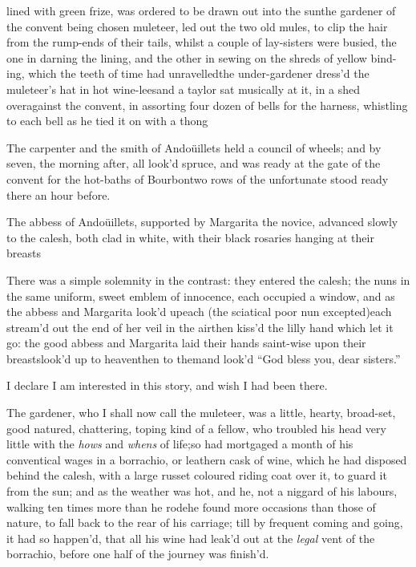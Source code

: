 \documentclass{article}
\begin{document}
\noindent
{}\break lined with green frize,
was ordered to be drawn out into the sun\tsk the gardener of the
convent being chosen muleteer, led out the two old mules, to clip
the hair from the rump-ends of their tails, whilst a couple of
lay-sisters were busied, the one in darning the lining, and the
other in sewing on the shreds of yellow bind- ing, which the teeth of
time had unravelled\tsh the under-gardener dress’d
the muleteer’s hat in hot wine-lees\tsh and a taylor
sat musically at it, in a shed overagainst the convent, in
assorting four dozen of bells for the harness, whistling to each
bell as he tied it on with a thong\tsh

\tsh The carpenter and the smith of Andoüillets held a council
of wheels; and by seven, the morning after, all look’d spruce,
and was ready at the gate of the convent for the hot-baths of
Bourbon\tsk\break two rows of the unfortunate stood ready there an
hour before.

The abbess of Andoüillets, supported by Margarita the novice, advanced slowly to the
calesh, both clad in white, with their black rosaries hanging at their breasts\tsh

\tsh There was a simple solemnity\break
in the contrast: they entered the calesh;\break
the nuns in the same uniform, sweet emblem of
innocence, each occupied a window, and as the abbess and
Margarita look’d up\tsk each (the sciatical poor nun
excepted)\tsk each stream’d out the end of her veil in the
air\tsk then kiss’d the lilly hand which let it go: the
good abbess and Margarita laid their hands saint-wise upon
their breasts\tsk look’d up to heaven\tsk then to
them\tsk and look’d “God bless you, dear
sisters.”

I declare I am interested in this story, and wish I had been
there.

The gardener, who I shall now call the muleteer, was a little,
hearty, broad-set, good natured, chattering, toping kind of a
fellow, who troubled his head very little with the \textit{hows} and
\textit{whens} of life;\break so had mortgaged a month of his conventical
wages in a borrachio, or leathern cask of wine, which he had
disposed behind the calesh, with a large russet coloured
riding coat over it, to guard it from the sun; and as the weather
was hot, and he, not a niggard of his labours, walking ten times
more than he rode\tsk he found more occasions than those of
nature, to fall back to the rear of his carriage; till by frequent
coming and going, it had so happen’d, that all his wine had
leak’d out at the \textit{legal} vent of the borrachio, before one
half of the journey was finish’d.
\end{document}
